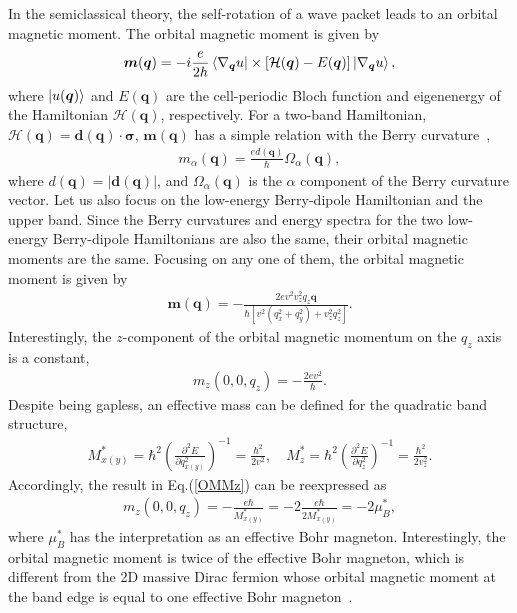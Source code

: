 \documentclass[aps,prl,twocolumn,longbibliography]{revtex4-1}
\newcommand{\bq}{\boldsymbol q}
\newcommand{\bd}{\boldsymbol d}
\newcommand{\bsigma}{\boldsymbol{\sigma}}
\begin{document}
\begin{widetext}
In the semiclassical theory, the self-rotation of a wave packet leads to an orbital magnetic moment. The orbital magnetic moment
is given by~\cite{Xiao2010BP}
\begin{eqnarray}
	\boldsymbol{m}(\bq)=-i\frac{e}{2h}\bra{\nabla_{\bq}u}\times\left[\mathcal{H}(\bq)-E(\bq)\right]\ket{\nabla_{\bq}u},
\end{eqnarray}
where $\ket{u(\bq)}$ and $E(\bq)$ are the cell-periodic Bloch function and eigenenergy of the Hamiltonian $\mathcal{H}(\bq)$,
respectively. For a two-band Hamiltonian, $\mathcal{H}(\bq)=\bd(\bq)\cdot\bsigma$, $\boldsymbol{m}(\bq)$ has a simple relation
with the Berry curvature~\cite{Xiao2007MM},
\begin{eqnarray}
	m_{\alpha}(\bq)=\frac{ed(\bq)}{\hbar}\Omega_{\alpha}(\bq),\label{OMMBC}
\end{eqnarray}
where $d(\bq)=|\bd(\bq)|$, and $\Omega_{\alpha}(\bq)$ is the $\alpha$ component of the Berry curvature vector.
Let us also focus on the low-energy Berry-dipole Hamiltonian and the upper band. Since the Berry curvatures
and energy spectra for the two low-energy Berry-dipole Hamiltonians are also the same,  their orbital magnetic moments are
the same. Focusing on any one of them, the orbital magnetic moment is given by
\begin{eqnarray}
	\boldsymbol{m}(\bq)=-\frac{2ev^{2}v_{z}^{2}q_{z}\bq}{\hbar [v^{2}(q_{x}^{2}+q_{y}^{2})+v_{z}^{2}q_{z}^{2}]}.
\end{eqnarray}
Interestingly, the $z$-component of the orbital magnetic momentum on the $q_{z}$ axis is a constant,
\begin{eqnarray}
	m_{z}(0,0,q_{z})=-\frac{2ev^{2}}{\hbar}.\label{OMMz}
\end{eqnarray}
Despite being gapless, an effective mass can be defined for the quadratic band structure,
\begin{eqnarray}
M_{x(y)}^{*}=\hbar^{2}\left(\frac{\partial^{2} E}{\partial q_{x(y)}^{2}}\right)^{-1}=\frac{\hbar^{2}}{2v^{2}}, \quad
M_{z}^{*}=\hbar^{2}\left(\frac{\partial^{2} E}{\partial q_{z}^{2}}\right)^{-1}=\frac{\hbar^{2}}{2v_{z}^{2}}.
\end{eqnarray}
Accordingly, the result in Eq.(\ref{OMMz}) can be reexpressed as
\begin{eqnarray}
m_{z}(0,0,q_{z})=-\frac{e\hbar}{M_{x(y)}^{*}}=-2\frac{e\hbar}{2M_{x(y)}^{*}}=-2\mu_{B}^{*}, \label{Bohr}
\end{eqnarray}
where $\mu_{B}^{*}$ has the interpretation as an effective Bohr magneton. Interestingly, the orbital magnetic moment
is twice of the effective Bohr magneton, which is different from the 2D massive Dirac fermion whose
orbital magnetic moment at the band edge is equal to one effective Bohr magneton~\cite{Xiao2007MM}.


\end{widetext}
\end{document}
